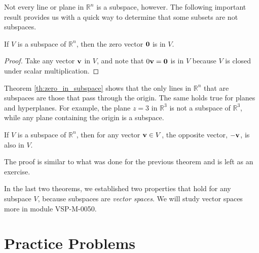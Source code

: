 \documentclass{ximera}
\renewcommand{\vec}[1]{{\bf #1}}
\newcommand{\RR}{\mathbb{R}}
\begin{document}
Not every line or plane in $\RR^n$ is a subspace, however.  The following important result provides us with a quick way to determine that some subsets are not subspaces.

\begin{theorem} \label{th:zero_in_subspace}
If $V$ is a subspace of $\RR^n$, then the zero vector $\vec{0}$ is in $V$.
\end{theorem}

\begin{proof} 
Take any vector $\vec{v}$ in $V$, and note that $0 \vec{v} = \vec{0}$ is in $V$ because $V$ is closed under scalar multiplication.
\end{proof}



Theorem \ref{th:zero_in_subspace} shows that the only lines in $\RR^n$ that are subspaces are those that pass through the origin.  The same holds true for planes and hyperplanes.  For example, the plane $z=3$ in $\RR^3$ is not a subspace of $\RR^3$, while any plane containing the origin is a subspace.

\begin{theorem} \label{opposite_in_subspace}
If $V$ is a subspace of $\RR^n$, then for any vector $\vec{v} \in V$, the opposite vector, $-\vec{v}$, is also in $V$.
\end{theorem}

The proof is similar to what was done for the previous theorem and is left as an exercise.

In the last two theorems, we established two properties that hold for any subspace $V$, because subspaces are \emph{vector spaces}.  We will study vector spaces more in module VSP-M-0050.



\section*{Practice Problems}
\end{document}
